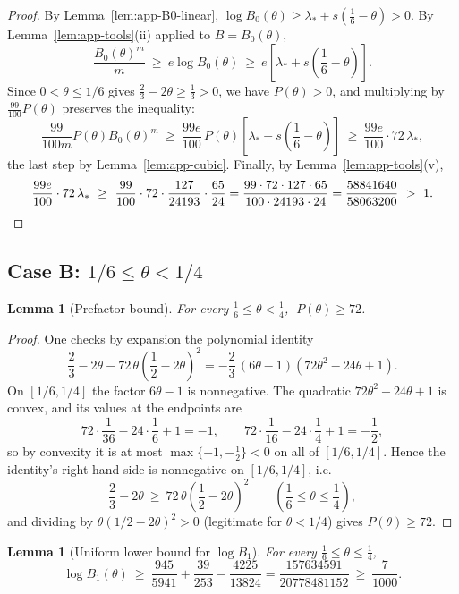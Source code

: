 \documentclass[11pt]{article}
\newtheorem{lemma}[theorem]{Lemma}
\theoremstyle{remark}
\theoremstyle{plain}
\theoremstyle{plain}
\begin{document}
\begin{proof}
By Lemma~\ref{lem:app-B0-linear},
$\log B_0(\theta)\ge\lambda_*+s(\frac16-\theta)>0$.  By
Lemma~\ref{lem:app-tools}(ii) applied to $B=B_0(\theta)$,
\[
        \frac{B_0(\theta)^m}{m}\ \ge\ e\log B_0(\theta)
        \ \ge\ e\left[\lambda_*+s\left(\frac16-\theta\right)\right].
\]
Since $0<\theta\le1/6$ gives $\frac23-2\theta\ge\frac13>0$, we have
$P(\theta)>0$, and multiplying by $\frac{99}{100}P(\theta)$ preserves the
inequality:
\[
        \frac{99}{100m}P(\theta)B_0(\theta)^m
        \ \ge\ \frac{99e}{100}\,P(\theta)
        \left[\lambda_*+s\left(\frac16-\theta\right)\right]
        \ \ge\ \frac{99e}{100}\cdot72\,\lambda_*,
\]
the last step by Lemma~\ref{lem:app-cubic}.  Finally, by
Lemma~\ref{lem:app-tools}(v),
\[
        \frac{99e}{100}\cdot72\,\lambda_*
        \ \ge\ \frac{99}{100}\cdot72\cdot\frac{127}{24193}\cdot\frac{65}{24}
        =\frac{99\cdot72\cdot127\cdot65}{100\cdot24193\cdot24}
        =\frac{58841640}{58063200}\ >\ 1 . \qedhere
\]
\end{proof}

\subsection*{Case B: $1/6\le\theta<1/4$}

\begin{lemma}[Prefactor bound]\label{lem:app-P72}
For every $\frac16\le\theta<\frac14$, $\;P(\theta)\ge72$.
\end{lemma}

\begin{proof}
One checks by expansion the polynomial identity
\[
        \frac23-2\theta-72\,\theta\left(\frac12-2\theta\right)^2
        =-\frac23\,(6\theta-1)(72\theta^2-24\theta+1).
\]
On $[1/6,1/4]$ the factor $6\theta-1$ is nonnegative.  The quadratic
$72\theta^2-24\theta+1$ is convex, and its values at the endpoints are
\[
        72\cdot\frac1{36}-24\cdot\frac16+1=-1,
        \qquad
        72\cdot\frac1{16}-24\cdot\frac14+1=-\frac12,
\]
so by convexity it is at most $\max\{-1,-\frac12\}<0$ on all of $[1/6,1/4]$.
Hence the identity's right-hand side is nonnegative on $[1/6,1/4]$, i.e.
\[
        \frac23-2\theta\ \ge\ 72\,\theta\left(\frac12-2\theta\right)^2
        \qquad\left(\frac16\le\theta\le\frac14\right),
\]
and dividing by $\theta(1/2-2\theta)^2>0$ (legitimate for $\theta<1/4$)
gives $P(\theta)\ge72$.
\end{proof}

\begin{lemma}[Uniform lower bound for $\log B_1$]\label{lem:app-B1-quad}
For every $\frac16\le\theta\le\frac14$,
\[
        \log B_1(\theta)\ \ge\
        \frac{945}{5941}+\frac{39}{253}-\frac{4225}{13824}
        =\frac{157634591}{20778481152}
        \ \ge\ \frac{7}{1000}.
\]
\end{lemma}
\end{document}
